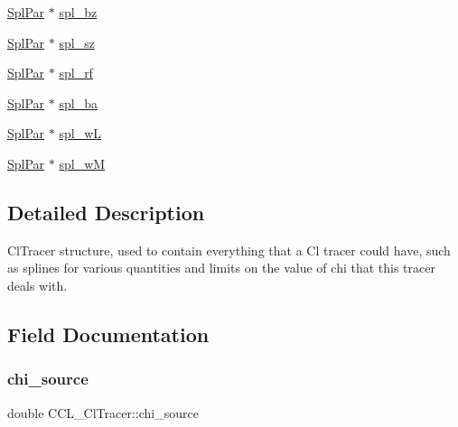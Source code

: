 \begin{DoxyCompactItemize}
\item 
\mbox{\hyperlink{struct_spl_par}{Spl\+Par}} $\ast$ \mbox{\hyperlink{struct_c_c_l___cl_tracer_a8efd94b42acc38fdbde6006537232cd5}{spl\+\_\+bz}}
\item 
\mbox{\hyperlink{struct_spl_par}{Spl\+Par}} $\ast$ \mbox{\hyperlink{struct_c_c_l___cl_tracer_a05f318f42d39d6fcb15dbb7ca23c45eb}{spl\+\_\+sz}}
\item 
\mbox{\hyperlink{struct_spl_par}{Spl\+Par}} $\ast$ \mbox{\hyperlink{struct_c_c_l___cl_tracer_a9895e56acfba92f8448a68acbf32c495}{spl\+\_\+rf}}
\item 
\mbox{\hyperlink{struct_spl_par}{Spl\+Par}} $\ast$ \mbox{\hyperlink{struct_c_c_l___cl_tracer_a6465ff884a3b359995b014a9165738cf}{spl\+\_\+ba}}
\item 
\mbox{\hyperlink{struct_spl_par}{Spl\+Par}} $\ast$ \mbox{\hyperlink{struct_c_c_l___cl_tracer_abae070ecb7e732d57565472d37b89604}{spl\+\_\+wL}}
\item 
\mbox{\hyperlink{struct_spl_par}{Spl\+Par}} $\ast$ \mbox{\hyperlink{struct_c_c_l___cl_tracer_aa631eb8b59ffa185566d445558992958}{spl\+\_\+wM}}
\end{DoxyCompactItemize}


\subsection{Detailed Description}
Cl\+Tracer structure, used to contain everything that a Cl tracer could have, such as splines for various quantities and limits on the value of chi that this tracer deals with. 

\subsection{Field Documentation}
\mbox{\label{struct_c_c_l___cl_tracer_a30b515b52f45e8281846749af76756ad}} 
\subsubsection{\texorpdfstring{chi\+\_\+source}{chi\_source}}
{\footnotesize\ttfamily double C\+C\+L\+\_\+\+Cl\+Tracer\+::chi\+\_\+source}

\mbox{\label{struct_c_c_l___cl_tracer_abecca79aa244fbc52bb07faece651988}} 
